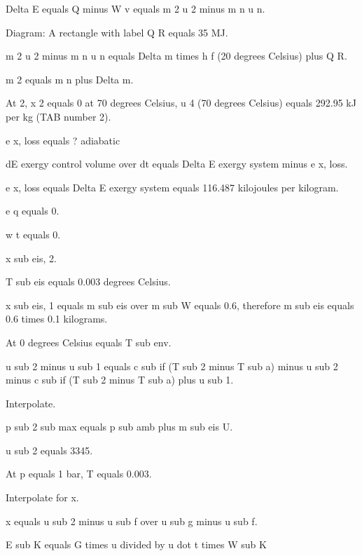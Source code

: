Delta E equals Q minus W v equals m 2 u 2 minus m n u n.

Diagram: A rectangle with label Q R equals 35 MJ.

m 2 u 2 minus m n u n equals Delta m times h f (20 degrees Celsius) plus Q R.

m 2 equals m n plus Delta m.

At 2, x 2 equals 0 at 70 degrees Celsius, u 4 (70 degrees Celsius) equals 292.95 kJ per kg (TAB number 2).

e x, loss equals ? adiabatic

dE exergy control volume over dt equals Delta E exergy system minus e x, loss.

e x, loss equals Delta E exergy system equals 116.487 kilojoules per kilogram.

e q equals 0.

w t equals 0.

x sub eis, 2.

T sub eis equals 0.003 degrees Celsius.

x sub eis, 1 equals m sub eis over m sub W equals 0.6, therefore m sub eis equals 0.6 times 0.1 kilograms.

At 0 degrees Celsius equals T sub env.

u sub 2 minus u sub 1 equals c sub if (T sub 2 minus T sub a) minus u sub 2 minus c sub if (T sub 2 minus T sub a) plus u sub 1.

Interpolate.

p sub 2 sub max equals p sub amb plus m sub eis U.

u sub 2 equals 3345.

At p equals 1 bar, T equals 0.003.

Interpolate for x.

x equals u sub 2 minus u sub f over u sub g minus u sub f.

E sub K equals G times u divided by u dot t times W sub K